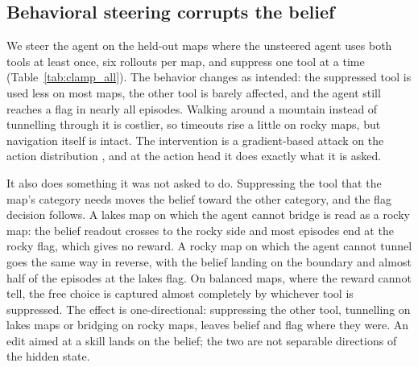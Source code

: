 \subsection{Behavioral steering corrupts the belief}
\label{sec:res_steer}
We steer the agent on the held-out maps where the unsteered agent uses both
tools at least once, six rollouts per map, and suppress one tool at a time
(Table~\ref{tab:clamp_all}). The behavior changes as intended: the suppressed
tool is used less on most maps, the other tool is barely affected, and the
agent still reaches a flag in nearly all episodes. Walking around a mountain
instead of tunnelling through it is costlier, so timeouts rise a little on
rocky maps, but navigation itself is intact. The intervention is a
gradient-based attack on the action distribution \citep{huang2017adversarial},
and at the action head it does exactly what it is asked.

It also does something it was not asked to do. Suppressing the tool that the
map's category needs moves the belief toward the other category, and the flag
decision follows. A lakes map on which the agent cannot bridge is read as a
rocky map: the belief readout crosses to the rocky side and most episodes end
at the rocky flag, which gives no reward. A rocky map on which the agent
cannot tunnel goes the same way in reverse, with the belief landing on the
boundary and almost half of the episodes at the lakes flag. On balanced maps,
where the reward cannot tell, the free choice is captured almost completely
by whichever tool is suppressed. The effect is one-directional: suppressing
the other tool, tunnelling on lakes maps or bridging on rocky maps, leaves
belief and flag where they were. An edit aimed at a skill lands on the
belief; the two are not separable directions of the hidden state.


